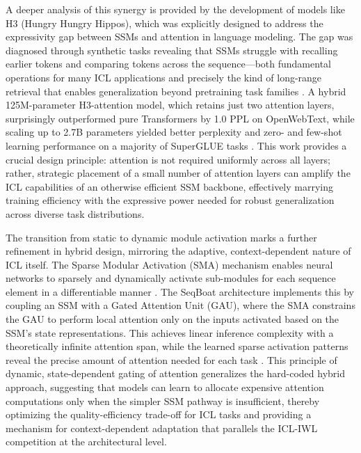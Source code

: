\documentclass[11pt]{article}
\begin{document}
A deeper analysis of this synergy is provided by the development of models like H3 (Hungry Hungry Hippos), which was explicitly designed to address the expressivity gap between SSMs and attention in language modeling. The gap was diagnosed through synthetic tasks revealing that SSMs struggle with recalling earlier tokens and comparing tokens across the sequence---both fundamental operations for many ICL applications and precisely the kind of long-range retrieval that enables generalization beyond pretraining task families \cite{ref119}. A hybrid 125M-parameter H3-attention model, which retains just two attention layers, surprisingly outperformed pure Transformers by 1.0 PPL on OpenWebText, while scaling up to 2.7B parameters yielded better perplexity and zero- and few-shot learning performance on a majority of SuperGLUE tasks \cite{ref119}. This work provides a crucial design principle: attention is not required uniformly across all layers; rather, strategic placement of a small number of attention layers can amplify the ICL capabilities of an otherwise efficient SSM backbone, effectively marrying training efficiency with the expressive power needed for robust generalization across diverse task distributions.

The transition from static to dynamic module activation marks a further refinement in hybrid design, mirroring the adaptive, context-dependent nature of ICL itself. The Sparse Modular Activation (SMA) mechanism enables neural networks to sparsely and dynamically activate sub-modules for each sequence element in a differentiable manner \cite{ref97}. The SeqBoat architecture implements this by coupling an SSM with a Gated Attention Unit (GAU), where the SMA constrains the GAU to perform local attention only on the inputs activated based on the SSM's state representations. This achieves linear inference complexity with a theoretically infinite attention span, while the learned sparse activation patterns reveal the precise amount of attention needed for each task \cite{ref97}. This principle of dynamic, state-dependent gating of attention generalizes the hard-coded hybrid approach, suggesting that models can learn to allocate expensive attention computations only when the simpler SSM pathway is insufficient, thereby optimizing the quality-efficiency trade-off for ICL tasks and providing a mechanism for context-dependent adaptation that parallels the ICL-IWL competition at the architectural level.
\end{document}
